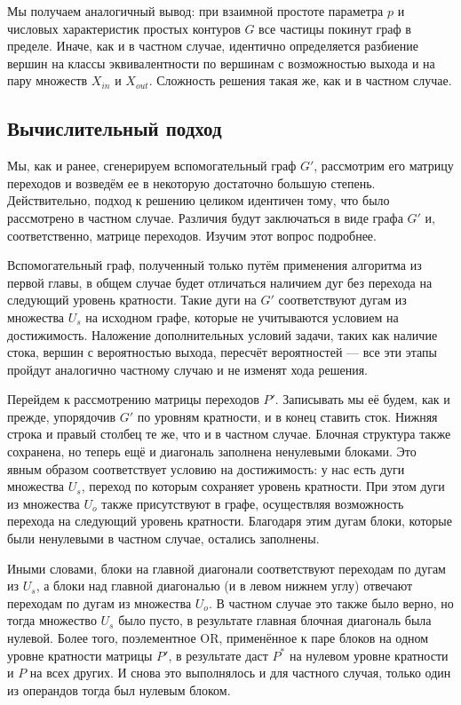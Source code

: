 Мы получаем аналогичный вывод: при взаимной простоте параметра $p$ и  числовых характеристик простых контуров $G$ все частицы покинут граф в пределе. Иначе, как и в частном случае, идентично определяется разбиение вершин на классы эквивалентности по вершинам с возможностью выхода и на пару множеств $X_{in}$ и $X_{out}$. Сложность решения такая же, как и в частном случае. 

\subsection{Вычислительный подход}

Мы, как и ранее, сгенерируем вспомогательный граф $G'$, рассмотрим его матрицу переходов и возведём ее в некоторую достаточно большую степень. Действительно, подход к решению целиком идентичен тому, что было рассмотрено в частном случае. Различия будут заключаться в виде графа $G'$ и, соответственно, матрице переходов. Изучим этот вопрос подробнее. 

Вспомогательный граф, полученный только путём применения алгоритма из первой главы, в общем случае будет отличаться наличием дуг без перехода на следующий уровень кратности. Такие дуги на $G'$ соответствуют дугам из множества $U_s$ на исходном графе, которые не учитываются условием на достижимость. Наложение дополнительных условий задачи, таких как наличие стока, вершин с вероятностью выхода, пересчёт вероятностей --- все эти этапы пройдут аналогично частному случаю и не изменят хода решения.

Перейдем к рассмотрению матрицы переходов $P'$. Записывать мы её будем, как и прежде, упорядочив $G'$ по уровням кратности, и в конец ставить сток. Нижняя строка и правый столбец те же, что и в частном случае. Блочная структура также сохранена, но теперь ещё и диагональ заполнена ненулевыми блоками. Это явным образом соответствует условию на достижимость: у нас есть дуги множества $U_s$, переход по которым сохраняет уровень кратности. При этом дуги из множества $U_o$ также присутствуют в графе, осуществляя возможность перехода на следующий уровень кратности. Благодаря этим дугам блоки, которые были ненулевыми в частном случае, остались заполнены. 

Иными словами, блоки на главной диагонали соответствуют переходам по дугам из $U_s$, а блоки над главной диагональю (и в левом нижнем углу) отвечают переходам по дугам из множества $U_o$. В частном случае это также было верно, но тогда множество $U_s$ было пусто, в результате главная блочная диагональ была нулевой. Более того, поэлементное OR, применённое к паре блоков на одном уровне кратности матрицы $P'$, в результате даст $P^*$ на нулевом уровне кратности и $P$ на всех других. И снова это выполнялось и для частного случая, только один из операндов тогда был нулевым блоком. 

